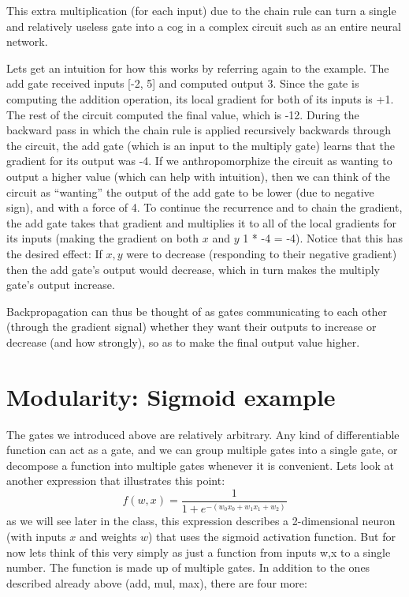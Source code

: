 This extra multiplication (for each input) due to the chain rule can turn a single and relatively useless gate into a cog in a complex circuit such as an entire neural network.

Lets get an intuition for how this works by referring again to the example. The add gate received inputs [-2, 5] and computed output 3. Since the gate is computing the addition operation, its local gradient for both of its inputs is +1. The rest of the circuit computed the final value, which is -12. During the backward pass in which the chain rule is applied recursively backwards through the circuit, the add gate (which is an input to the multiply gate) learns that the gradient for its output was -4. If we anthropomorphize the circuit as wanting to output a higher value (which can help with intuition), then we can think of the circuit as “wanting” the output of the add gate to be lower (due to negative sign), and with a force of 4. To continue the recurrence and to chain the gradient, the add gate takes that gradient and multiplies it to all of the local gradients for its inputs (making the gradient on both $x$ and $y$ 1 * -4 = -4). Notice that this has the desired effect: If $x,y$ were to decrease (responding to their negative gradient) then the add gate’s output would decrease, which in turn makes the multiply gate’s output increase.

Backpropagation can thus be thought of as gates communicating to each other (through the gradient signal) whether they want their outputs to increase or decrease (and how strongly), so as to make the final output value higher.


\section*{Modularity: Sigmoid example}

The gates we introduced above are relatively arbitrary. Any kind of differentiable function can act as a gate, and we can group multiple gates into a single gate, or decompose a function into multiple gates whenever it is convenient. Lets look at another expression that illustrates this point:
\begin{equation}
f(w,x) = \frac{1}{1+e^{-(w_0x_0 + w_1x_1 + w_2)}}
\end{equation}
as we will see later in the class, this expression describes a 2-dimensional neuron (with inputs $x$ and weights $w$) that uses the sigmoid activation function. But for now lets think of this very simply as just a function from inputs w,x to a single number. The function is made up of multiple gates. In addition to the ones described already above (add, mul, max), there are four more:

